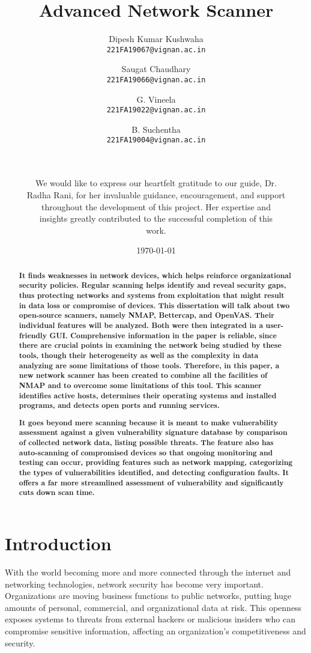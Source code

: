\documentclass[conference]{IEEEtran}
\title{Advanced Network Scanner}
\author{
    Dipesh Kumar Kushwaha\\
    \texttt{221FA19067@vignan.ac.in}
    \and
    Saugat Chaudhary\\
    \texttt{221FA19066@vignan.ac.in}
    \and
    G. Vineela\\
    \texttt{221FA19022@vignan.ac.in}
    \and
    B. Suchentha\\
    \texttt{221FA19004@vignan.ac.in} 
    \and
    \\
    \\
    We would like to express our heartfelt gratitude to our guide, Dr.\\ Radha Rani, for her invaluable guidance, encouragement, and support\\ throughout the development of this project. Her expertise and\\ insights greatly contributed to the successful completion of this\\ work.\\
}
\date{\today}
\begin{document}
\maketitle

\begin{abstract}
\textbf{It finds weaknesses in network devices, which helps reinforce organizational security policies. Regular scanning helps identify and reveal security gaps, thus protecting networks and systems from exploitation that might result in data loss or compromise of devices.
This dissertation will talk about two open-source scanners, namely NMAP, Bettercap, and OpenVAS. Their individual features will be analyzed. Both were then integrated in a user-friendly GUI. Comprehensive information in the paper is reliable, since there are crucial points in examining the network being studied by these tools, though their heterogeneity as well as the complexity in data analyzing are some limitations of those tools. Therefore, in this paper, a new network scanner has been created to combine all the facilities of NMAP and to overcome some limitations of this tool. This scanner identifies active hosts, determines their operating systems and installed programs, and detects open ports and running services.}

\textbf{It goes beyond mere scanning because it is meant to make vulnerability assessment against a given vulnerability signature database by comparison of collected network data, listing possible threats. The feature also has auto-scanning of compromised devices so that ongoing monitoring and testing can occur, providing features such as network mapping, categorizing the types of vulnerabilities identified, and detecting configuration faults. It offers a far more streamlined assessment of vulnerability and significantly cuts down scan time.}

\end{abstract}

\section{Introduction}
With the world becoming more and more connected through the internet and networking technologies, network security has become very important. Organizations are moving business functions to public networks, putting huge amounts of personal, commercial, and organizational data at risk. This openness exposes systems to threats from external hackers or malicious insiders who can compromise sensitive information, affecting an organization's competitiveness and security.
\end{document}
